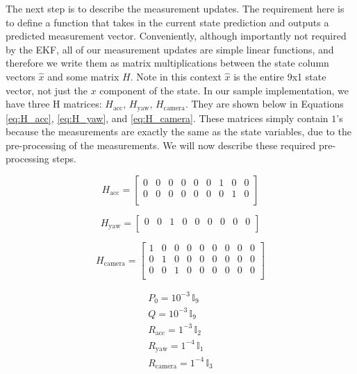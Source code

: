 \documentclass{article}
\begin{document}
    The next step is to describe the measurement updates. The requirement here is to define a function that takes in the current state prediction and outputs a predicted measurement vector. Conveniently, although importantly not required by the EKF, all of our measurement updates are simple linear functions, and therefore we write them as matrix multiplications between the state column vectors $\hat{x}$ and some matrix $H$. Note in this context $\hat{x}$ is the entire 9x1 state vector, not just the $x$ component of the state. In our sample implementation, we have three H matrices: $H_{\text{acc}}$, $H_{\text{yaw}}$, $H_{\text{camera}}$. They are shown below in Equations \ref{eq:H_acc}, \ref{eq:H_yaw}, and \ref{eq:H_camera}. These matrices simply contain $1$'s because the measurements are exactly the same as the state variables, due to the pre-processing of the measurements. We will now describe these required pre-processing steps.

    \begin{equation} \label{eq:H_acc}
      H_{\text{acc}} =
      \begin{bmatrix}
        0 & 0 & 0 & 0 & 0 & 0 & 1 & 0 & 0 \\
        0 & 0 & 0 & 0 & 0 & 0 & 0 & 1 & 0 \\
      \end{bmatrix}
    \end{equation}

    \begin{equation} \label{eq:H_yaw}
      H_{\text{yaw}} =
      \begin{bmatrix}
        0 & 0 & 1 & 0 & 0 & 0 & 0 & 0 & 0 \\
      \end{bmatrix}
    \end{equation}

    \begin{equation} \label{eq:H_camera}
      H_{\text{camera}} =
      \begin{bmatrix}
        1 & 0 & 0 & 0 & 0 & 0 & 0 & 0 & 0 \\
        0 & 1 & 0 & 0 & 0 & 0 & 0 & 0 & 0 \\
        0 & 0 & 1 & 0 & 0 & 0 & 0 & 0 & 0 \\
      \end{bmatrix}
    \end{equation}

    \begin{equation} \label{eq:H_camera}
      \begin{split}
        P_0 = 10^{-3}\,\mathbb{I}_9 \\
        Q = 10^{-3}\,\mathbb{I}_9 \\
        R_{\text{acc}} = 1^{-3}\,\mathbb{I}_2 \\
        R_{\text{yaw}} = 1^{-4}\,\mathbb{I}_1 \\
        R_{\text{camera}} = 1^{-4}\,\mathbb{I}_3 \\
      \end{split}
    \end{equation}
\end{document}
